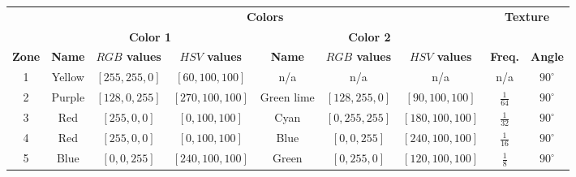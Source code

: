 \begin{table}[h!]
\begin{tabular}{c|c|c|c|c|c|c|c|c|}
\cline{2-9}
\textbf{}                                & \multicolumn{6}{c|}{\textbf{Colors}}                                                                                                                                        & \multicolumn{2}{c|}{\multirow{2}{*}{\textbf{Texture}}} \\ \cline{2-7}
                                         & \multicolumn{3}{c|}{\textbf{Color 1}}                                            & \multicolumn{3}{c|}{\textbf{Color 2}}                                                    & \multicolumn{2}{c|}{}                                  \\ \hline
\multicolumn{1}{|c|}{\textbf{Zone}}      & \textbf{Name}          & \textbf{$RGB$ values}      & \textbf{$HSV$ values}      & \textbf{Name}          & \textbf{$RGB$ values}            & \textbf{$HSV$ values}        & \textbf{Freq.}             & \textbf{Angle}            \\ \hline
\multicolumn{1}{|c|}{1}                  & Yellow                 & $[255,255,0]$              & $[60,100,100]$             & n/a                    & n/a                              & n/a                          & n/a                        & $90^\circ$                \\ \hline
\multicolumn{1}{|c|}{2}                  & Purple                 & $[128, 0, 255]$            & $[270,100,100]$            & Green lime             & $[128, 255, 0]$                  & $[90,100,100]$               & $\frac{1}{64}$             & $90^\circ$                \\ \hline
\multicolumn{1}{|c|}{3}                  & Red                    & $[255,0,0]$                & $[0,100,100]$              & Cyan                   & $[0,255,255]$                    & $[180,100,100]$              & $\frac{1}{32}$             & $90^\circ$                \\ \hline
\multicolumn{1}{|c|}{4}                  & Red                    & $[255,0,0]$                & $[0,100,100]$              & Blue                   & $[0,0,255]$                      & $[240,100,100]$              & $\frac{1}{16}$             & $90^\circ$                \\ \hline
\multicolumn{1}{|c|}{5}                  & Blue                   & $[0,0,255]$                & $[240,100,100]$            & Green                  & $[0,255,0]$                      & $[120,100,100]$              & $\frac{1}{8}$              & $90^\circ$                \\ \hline

\end{tabular}
\end{table}
